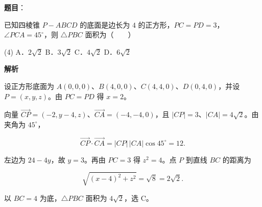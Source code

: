 \begin{answer}

\textbf{题目}：

已知四棱锥 $P-ABCD$ 的底面是边长为 $4$ 的正方形，$PC=PD=3$，$\angle PCA=45^\circ$，则 $\triangle PBC$ 面积为\mbox{（　　）}

\begin{gkopts}(4)
\task A．$2\sqrt2$
\task B．$3\sqrt2$
\task C．$4\sqrt2$
\task D．$6\sqrt2$
\end{gkopts}

\textbf{解析}

设正方形底面为 $A(0,0,0)$、$B(4,0,0)$、$C(4,4,0)$、$D(0,4,0)$，并设 $P=(x,y,z)$。由 $PC=PD$ 得 $x=2$。

向量 $\overrightarrow{CP}=(-2,y-4,z)$、$\overrightarrow{CA}=(-4,-4,0)$，且 $|CP|=3$、$|CA|=4\sqrt2$。由夹角为 $45^\circ$，

\nopagebreak[4]
\[
\overrightarrow{CP}\cdot\overrightarrow{CA}
=|CP|\,|CA|\cos45^\circ=12.
\]

左边为 $24-4y$，故 $y=3$。再由 $PC=3$ 得 $z^2=4$。点 $P$ 到直线 $BC$ 的距离为

\nopagebreak[4]
\[
\sqrt{(x-4)^2+z^2}=\sqrt8=2\sqrt2.
\]

以 $BC=4$ 为底，$\triangle PBC$ 面积为 $4\sqrt2$，选 C。


\end{answer}
